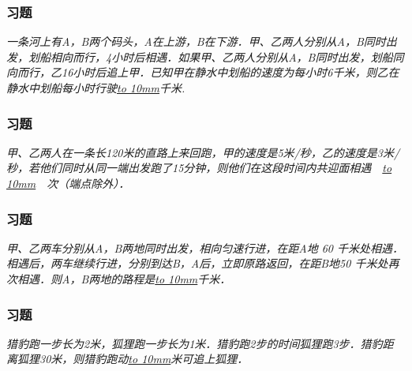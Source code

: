 \begin{frame}
    \frametitle{习题\theframecounter}
    \vspace*{-3cm}
    \textit{一条河上有A，B两个码头，A在上游，B在下游．甲、乙两人分别从A，B同时出发，划船相向而行，4小时后相遇．如果甲、乙两人分别从A，B同时出发，划船同向而行，乙16小时后追上甲．已知甲在静水中划船的速度为每小时6千米，则乙在静水中划船每小时行驶\underline{\hbox to 10mm{}}千米.}
\end{frame}

\begin{frame}
    \frametitle{习题\theframecounter}
    \vspace*{-3cm}
    \textit{甲、乙两人在一条长120米的直路上来回跑，甲的速度是5米/秒，乙的速度是3米/秒，若他们同时从同一端出发跑了15分钟，则他们在这段时间内共迎面相遇　\underline{\hbox to 10mm{}}　次（端点除外）．}
\end{frame}

\begin{frame}
    \frametitle{习题\theframecounter}
    \vspace*{-3cm}
    \textit{甲、乙两车分别从A，B两地同时出发，相向匀速行进，在距A地 60 千米处相遇．相遇后，两车继续行进，分别到达B，A后，立即原路返回，在距B地50 千米处再次相遇．则A，B两地的路程是\underline{\hbox to 10mm{}}千米．}
\end{frame}

\begin{frame}
    \frametitle{习题\theframecounter}
    \vspace*{-3cm}
    \textit{猎豹跑一步长为2米，狐狸跑一步长为1米．猎豹跑2步的时间狐狸跑3步．猎豹距离狐狸30米，则猎豹跑动\underline{\hbox to 10mm{}}米可追上狐狸．}
\end{frame}
